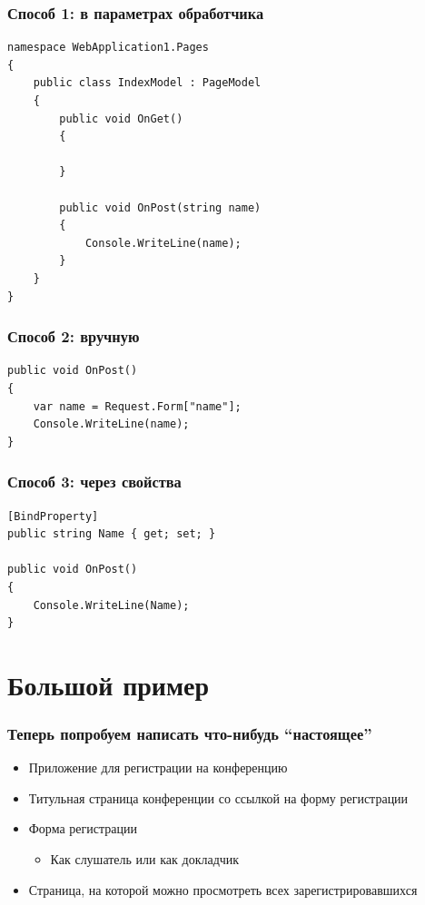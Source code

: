 \documentclass[xetex,mathserif,serif]{beamer}
\begin{document}
	\begin{frame}[fragile]
		\frametitle{Способ 1: в параметрах обработчика}
		\begin{small}
			\begin{verbatim}
namespace WebApplication1.Pages
{
    public class IndexModel : PageModel
    {
        public void OnGet()
        {

        }

        public void OnPost(string name)
        {
            Console.WriteLine(name);
        }
    }
}
			\end{verbatim}
		\end{small}
	\end{frame}

	\begin{frame}[fragile]
		\frametitle{Способ 2: вручную}
		\begin{small}
			\begin{verbatim}
public void OnPost()
{
    var name = Request.Form["name"];
    Console.WriteLine(name);
}
			\end{verbatim}
		\end{small}
	\end{frame}

	\begin{frame}[fragile]
		\frametitle{Способ 3: через свойства}
		\begin{small}
			\begin{verbatim}
[BindProperty]
public string Name { get; set; }

public void OnPost()
{
    Console.WriteLine(Name);
}
			\end{verbatim}
		\end{small}
	\end{frame}

	\section{Большой пример}

	\begin{frame}
		\frametitle{Теперь попробуем написать что-нибудь ``настоящее''}
		\begin{itemize}
			\item Приложение для регистрации на конференцию
			\item Титульная страница конференции со ссылкой на форму регистрации
			\item Форма регистрации
			\begin{itemize}
				\item Как слушатель или как докладчик
			\end{itemize}
			\item Страница, на которой можно просмотреть всех зарегистрировавшихся
		\end{itemize}
	\end{frame}
\end{document}
